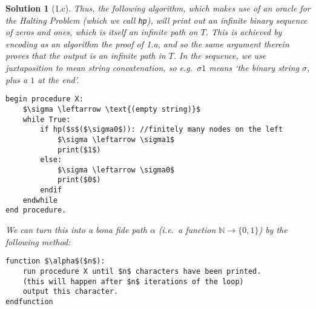 \documentclass{article}
\theoremstyle{nonumberplain}
\newtheorem{sol}{Solution}
\newcommand{\N}{\mathbb{N}}
\begin{document}
\begin{sol}[1.c]
Thus, the following algorithm, which makes use of an oracle for the Halting Problem (which we call \texttt{hp}), will print out an infinite binary sequence of zeros and ones, which is itself an infinite path on $T$. This is achieved by encoding as an algorithm the proof of 1.a, and so the same argument therein proves that the output is an infinite path in $T$. In the sequence, we use juxtaposition to mean string concatenation, so e.g.\ $\sigma1$ means `the binary string $\sigma$, plus a $1$ at the end'.
\begin{lstlisting}
begin procedure X:
    $\sigma \leftarrow \text{(empty string)}$
    while True:
        if hp($s$($\sigma0$)): //finitely many nodes on the left
            $\sigma \leftarrow \sigma1$
            print($1$)
        else:
            $\sigma \leftarrow \sigma0$
            print($0$)
        endif
    endwhile
end procedure.
\end{lstlisting}

We can turn this into a \textit{bona fide} path $\alpha$ (i.e.\ a function $\N \to \{0,1\}$) by the following method:
\begin{lstlisting}
function $\alpha$($n$):
    run procedure X until $n$ characters have been printed.
    (this will happen after $n$ iterations of the loop)
    output this character.
endfunction
\end{lstlisting}
\end{sol}
\end{document}
